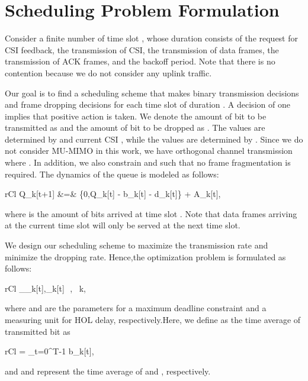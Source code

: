 \documentclass[conference]{IEEEtran}
\newcommand{\beqna}{\begin{IEEEeqnarray}{rCl}}
\newcommand{\eeqna}{\end{IEEEeqnarray}}
\newcommand{\0}{\vect{0}}
\newcommand{\1}{\vect{1}}
\begin{document}
\section{Scheduling Problem Formulation}\label{sec:opt}

Consider a finite number of time slot , whose duration consists of the request for CSI feedback, the transmission of CSI, the transmission of data frames, the transmission of ACK frames, and the backoff period. Note that there is no contention because we do not consider any uplink traffic.

Our goal is to find a scheduling scheme that makes binary transmission decisions  and frame dropping decisions  for each time slot of duration . A decision of one implies that positive action is taken. We denote the amount of bit to be transmitted as  and the amount of bit to be dropped as . The  values are determined by  and current CSI , while the  values are determined by . Since we do not consider MU-MIMO in this work, we have orthogonal channel transmission where . In addition, we also constrain  and  such that no frame fragmentation is required. The dynamics of the queue is modeled as follows:
\beqna
Q_k[t+1] &=& \max\{0,Q_k[t] - b_k[t] - d_k[t]\} + A_k[t], \label{eqn:Q_kt}
\eeqna
where  is the amount of bits arrived at time slot . Note that data frames arriving at the current time slot will only be served at the next time slot.


We design our scheduling scheme to maximize the transmission rate and minimize the dropping rate. Hence,the optimization problem is formulated as follows:
\beqna
\max_{\mu_k[t],\omega_k[t]}\,\, , ~\forall k,\label{eqn:opt1}
\eeqna
where  and  are the parameters for a maximum deadline constraint and a measuring unit for HOL delay, respectively.Here, we define  as the  time average of transmitted bit  as
\beqna
{} =  \sum_{t=0}^{T-1} b_k[t],
\eeqna
and  and  represent the time average of  and , respectively.
\end{document}
